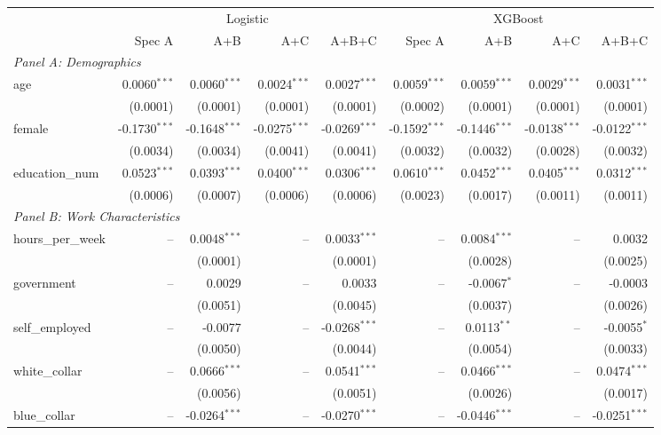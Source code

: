 \documentclass[conference]{IEEEtran}
\begin{document}
\begin{table}[htbp]
{\begin{threeparttable}
				\begin{tabular}{lrrrrrrrr}
					\toprule
					& \multicolumn{4}{c}{Logistic} & \multicolumn{4}{c}{XGBoost} \\
					\cmidrule(lr){2-5} \cmidrule(lr){6-9} 
					& Spec A & A+B & A+C & A+B+C & Spec A & A+B & A+C & A+B+C \\
					\midrule
					\multicolumn{9}{l}{\textit{Panel A: Demographics}} \\
					\quad age & 0.0060$^{***}$ & 0.0060$^{***}$ & 0.0024$^{***}$ & 0.0027$^{***}$ & 0.0059$^{***}$ & 0.0059$^{***}$ & 0.0029$^{***}$ & 0.0031$^{***}$ \\
					& (0.0001) & (0.0001) & (0.0001) & (0.0001) & (0.0002) & (0.0001) & (0.0001) & (0.0001) \\
					\quad female & -0.1730$^{***}$ & -0.1648$^{***}$ & -0.0275$^{***}$ & -0.0269$^{***}$ & -0.1592$^{***}$ & -0.1446$^{***}$ & -0.0138$^{***}$ & -0.0122$^{***}$ \\
					& (0.0034) & (0.0034) & (0.0041) & (0.0041) & (0.0032) & (0.0032) & (0.0028) & (0.0032) \\
					\quad education\_num & 0.0523$^{***}$ & 0.0393$^{***}$ & 0.0400$^{***}$ & 0.0306$^{***}$ & 0.0610$^{***}$ & 0.0452$^{***}$ & 0.0405$^{***}$ & 0.0312$^{***}$ \\
					& (0.0006) & (0.0007) & (0.0006) & (0.0006) & (0.0023) & (0.0017) & (0.0011) & (0.0011) \\
					\midrule
					\multicolumn{9}{l}{\textit{Panel B: Work Characteristics}} \\
					\quad hours\_per\_week & -- & 0.0048$^{***}$ & -- & 0.0033$^{***}$ & -- & 0.0084$^{***}$ & -- & 0.0032 \\
					&  & (0.0001) &  & (0.0001) &  & (0.0028) &  & (0.0025) \\
					\quad government & -- & 0.0029 & -- & 0.0033 & -- & -0.0067$^{*}$ & -- & -0.0003 \\
					&  & (0.0051) &  & (0.0045) &  & (0.0037) &  & (0.0026) \\
					\quad self\_employed & -- & -0.0077 & -- & -0.0268$^{***}$ & -- & 0.0113$^{**}$ & -- & -0.0055$^{*}$ \\
					&  & (0.0050) &  & (0.0044) &  & (0.0054) &  & (0.0033) \\
					\quad white\_collar & -- & 0.0666$^{***}$ & -- & 0.0541$^{***}$ & -- & 0.0466$^{***}$ & -- & 0.0474$^{***}$ \\
					&  & (0.0056) &  & (0.0051) &  & (0.0026) &  & (0.0017) \\
					\quad blue\_collar & -- & -0.0264$^{***}$ & -- & -0.0270$^{***}$ & -- & -0.0446$^{***}$ & -- & -0.0251$^{***}$ \\

\end{tabular}
\end{threeparttable}}
\end{table}
\end{document}
